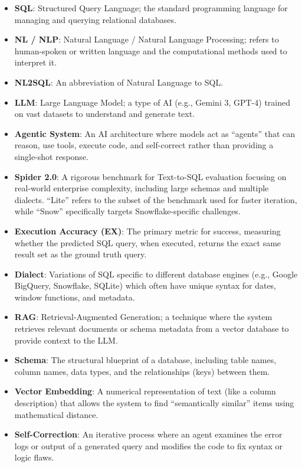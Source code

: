 \begin{itemize}

\item \textbf{SQL}: Structured Query Language; the standard programming language for managing and querying relational databases.
\item \textbf{NL / NLP}: Natural Language / Natural Language Processing; refers to human-spoken or written language and the computational methods used to interpret it.
\item \textbf{NL2SQL}: An abbreviation of Natural Language to SQL.
\item \textbf{LLM}: Large Language Model; a type of AI (e.g., Gemini 3, GPT-4) trained on vast datasets to understand and generate text.
\item \textbf{Agentic System}: An AI architecture where models act as “agents” that can reason, use tools, execute code, and self-correct rather than providing a single-shot response.
\item \textbf{Spider 2.0}: A rigorous benchmark for Text-to-SQL evaluation focusing on real-world enterprise complexity, including large schemas and multiple dialects. ``Lite'' refers to the subset of the benchmark used for faster iteration, while ``Snow'' specifically targets Snowflake-specific challenges.
\item \textbf{Execution Accuracy (EX)}: The primary metric for success, measuring whether the predicted SQL query, when executed, returns the exact same result set as the ground truth query.
\item \textbf{Dialect}: Variations of SQL specific to different database engines (e.g., Google BigQuery, Snowflake, SQLite) which often have unique syntax for dates, window functions, and metadata.
\item \textbf{RAG}: Retrieval-Augmented Generation; a technique where the system retrieves relevant documents or schema metadata from a vector database to provide context to the LLM.
\item \textbf{Schema}: The structural blueprint of a database, including table names, column names, data types, and the relationships (keys) between them.
\item \textbf{Vector Embedding}: A numerical representation of text (like a column description) that allows the system to find ``semantically similar'' items using mathematical distance.
\item \textbf{Self-Correction}: An iterative process where an agent examines the error logs or output of a generated query and modifies the code to fix syntax or logic flaws.

\end{itemize}
